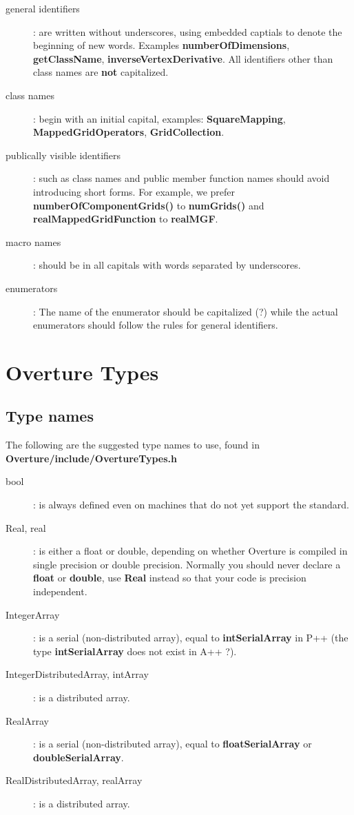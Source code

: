 \documentclass{article}
\begin{document}
\begin{description}
  \item[general identifiers]: are written without underscores, using embedded captials to 
   denote the beginning of new words. Examples {\bf numberOfDimensions}, {\bf getClassName}, 
    {\bf inverseVertexDerivative}. All identifiers other than class names are {\bf not} capitalized.
  \item[class names] : begin with an initial capital, examples: {\bf SquareMapping}, {\bf MappedGridOperators},
   {\bf GridCollection}.
  \item[publically visible identifiers] : such as class names and public member function names should avoid introducing
    short forms. For example, we prefer {\bf numberOfComponentGrids()} to {\bf numGrids()} and
    {\bf realMappedGridFunction} to {\bf realMGF}.
  \item[macro names] : should be in all capitals with words separated by underscores.
  \item[enumerators] : The name of the enumerator should be capitalized (?) while the actual enumerators
    should follow the rules for general identifiers.
\end{description}


\section{Overture Types}

\subsection{Type names}
The following are the suggested type names to use, found in 
{\bf Overture/include/OvertureTypes.h}

\begin{description}
  \item[bool] :  is always defined even on machines that do not yet support the standard.
  \item[Real, real] : is either a float or double, depending on whether Overture is compiled in 
           single precision or double precision. Normally you should never declare a {\bf float}
           or {\bf double}, use {\bf Real} instead so that your code is precision independent.
  \item[IntegerArray] : is a serial (non-distributed array), equal to {\bf intSerialArray} 
       in P++ (the type {\bf intSerialArray} does not exist in A++ ?).
  \item[IntegerDistributedArray, intArray] : is a distributed array.
  \item[RealArray] : is a serial (non-distributed array), equal to {\bf floatSerialArray} or
        {\bf doubleSerialArray}.     
  \item[RealDistributedArray, realArray] : is a distributed array.
\end{description}
\end{document}
